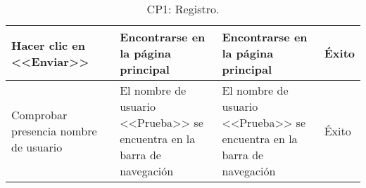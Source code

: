 \begin{center}
\begin{table}[H]
\begin{tabular}{p{}p{}p{}p{}p{}}
    Hacer clic en <<Enviar>>                             &                                                                                                         & Encontrarse en la página principal                                   & Encontrarse en la página principal                                   & Éxito                            \\ \hline
    Comprobar presencia nombre de usuario              &                                                                                                         & El nombre de usuario <<Prueba>> se encuentra en la barra de navegación & El nombre de usuario <<Prueba>> se encuentra en la barra de navegación & Éxito                           
    \end{tabular}
    \caption{CP1: Registro.}
    \end{table}
    \end{center}
    
